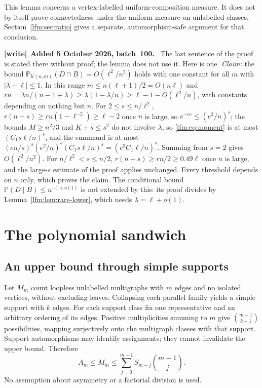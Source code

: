 \documentclass[11pt,letterpaper]{article}
\theoremstyle{remark}\newtheorem{remark}[theorem]{Remark}
\newcommand{\Prob}{\mathbb P}\newcommand{\E}{\mathbb E}
\newcommand{\U}{\mathcal U}\newcommand{\dd}{\,\mathrm d}
\newenvironment{writenote}[1][]{\par\smallskip\begingroup\small
 \noindent\textbf{[write]}\if\relax\detokenize{#1}\relax\else~\textbf{#1.}\fi\ }%
 {\par\endgroup\smallskip}
\begin{document}
This lemma concerns a vertex-labelled uniform-composition measure. It does not by itself prove connectedness under the uniform measure on unlabelled classes. Section~\ref{lfm:sec:ratio} gives a separate, automorphism-safe argument for that conclusion.

\begin{writenote}[Added 5 October 2026, batch~100]
The last sentence of the proof is stated there without proof; the lemma does
not use it. Here is one. \emph{Claim:} the bound
$\Prob_{\U(n,m)}(D\cap B)=O(\ell^2/n^2)$ holds with one constant for all $m$
with $|\lambda-\ell|\le1$. In this range $m\le n(\ell+1)/2=O(n\ell)$ and
$rn=\lambda n/(n-1+\lambda)\ge\lambda(1-\lambda/n)\ge\ell-1-O(\ell^2/n)$, with
constants depending on nothing but $n$. For $2\le s\le n/\ell^2$,
$r(n-s)\ge rn(1-\ell^{-2})\ge\ell-2$ once $n$ is large, so
$e^{-rc}\le(e^2/n)^s$; the bounds $M\ge n^2/3$ and $K+s\le s^2$ do not involve
$\lambda$, so \eqref{lfm:eq:moment} is at most $(C_1s\ell/n)^s$, and the
summand is at most $(en/s)^s(e^2/n)^s(C_1s\ell/n)^s=(e^3C_1\ell/n)^s$. Summing
from $s=2$ gives $O(\ell^2/n^2)$. For $n/\ell^2<s\le n/2$,
$r(n-s)\ge rn/2\ge0.49\ell$ once $n$ is large, and the large-$s$ estimate of
the proof applies unchanged. Every threshold depends on $n$ only, which
proves the claim. The conditional bound $\Prob(D\mid B)\le n^{-1+o(1)}$ is
not extended by this: its proof divides by Lemma~\ref{lfm:lem:rare-lower},
which needs $\lambda=\ell+o(1)$.
\end{writenote}

\section{The polynomial sandwich}
\subsection{An upper bound through simple supports}\label{lfm:sec:support}
Let $M_m$ count loopless unlabelled multigraphs with $m$ edges and no isolated vertices, without excluding leaves. Collapsing each parallel family yields a simple support with $k$ edges. For each support class fix one representative and an arbitrary ordering of its edges. Positive multiplicities summing to $m$ give $\binom{m-1}{k-1}$ possibilities, mapping surjectively onto the multigraph classes with that support. Support automorphisms may identify assignments; they cannot invalidate the upper bound. Therefore
\begin{equation}
 A_m\le M_m\le\sum_{j=0}^{m-1}S_{m-j}\binom{m-1}{j}.\label{lfm:eq:support}
\end{equation}
No assumption about asymmetry or a factorial division is used.
\end{document}
